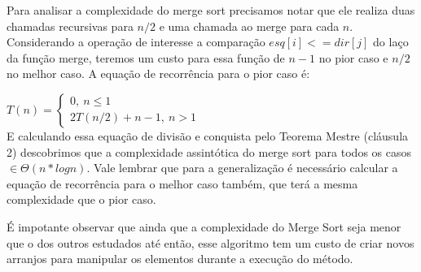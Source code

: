 \documentclass[a4paper, twocolumn]{article}
\theoremstyle{definition}
\begin{document}
Para analisar a complexidade do merge sort precisamos notar que ele realiza duas chamadas recursivas para $n/2$ e uma chamada ao merge para cada $n$. Considerando a operação de interesse a comparação $esq[i] <= dir[j]$ do laço da função merge, teremos um custo para essa função de $n-1$ no pior caso e $n/2$ no melhor caso. A equação de recorrência para o pior caso é:

$T(n) = \begin{cases} 
	0, \ n \leq 1\\
	2T(n/2) + n-1, \ n > 1
\end{cases}$ \\

E calculando essa equação de divisão e conquista pelo Teorema Mestre (cláusula 2) descobrimos que a complexidade assintótica do merge sort para todos os casos  $\in \Theta(n*log n)$. Vale lembrar que para a generalização é necessário calcular a equação de recorrência para o melhor caso também, que terá a mesma complexidade que o pior caso.

É impotante observar que ainda que a complexidade do Merge Sort seja menor que o dos outros estudados até então, esse algoritmo tem um custo de criar novos arranjos para manipular os elementos durante a execução do método.
\end{document}
